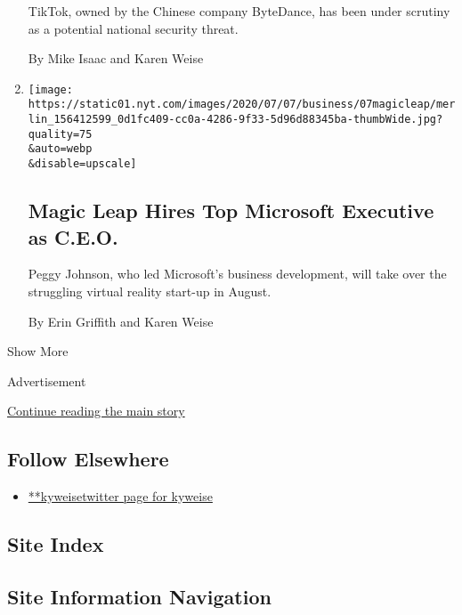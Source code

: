 \begin{enumerate}
  TikTok, owned by the Chinese company ByteDance, has been under
  scrutiny as a potential national security threat.

  By Mike Isaac and Karen Weise
\item
  \href{/2020/07/07/technology/peggy-johnson-magic-leap-ceo.html}{}

  \texttt{[image: https://static01.nyt.com/images/2020/07/07/business/07magicleap/merlin\_156412599\_0d1fc409-cc0a-4286-9f33-5d96d88345ba-thumbWide.jpg?quality=75\\\&auto=webp\\\&disable=upscale]}

  \hypertarget{magic-leap-hires-top-microsoft-executive-as-ceo}{%
  \subsection{Magic Leap Hires Top Microsoft Executive as
  C.E.O.}\label{magic-leap-hires-top-microsoft-executive-as-ceo}}

  Peggy Johnson, who led Microsoft's business development, will take
  over the struggling virtual reality start-up in August.

  By Erin Griffith and Karen Weise
\end{enumerate}

Show More

Advertisement

\protect\hyperlink{after-mid2}{Continue reading the main story}

\hypertarget{follow-elsewhere}{%
\subsection{Follow Elsewhere}\label{follow-elsewhere}}

\begin{itemize}
\tightlist
\item
  \href{https://twitter.com/kyweise}{**kyweisetwitter page for kyweise}
\end{itemize}

\hypertarget{site-index}{%
\subsection{Site Index}\label{site-index}}

\hypertarget{site-information-navigation}{%
\subsection{Site Information
Navigation}\label{site-information-navigation}}

